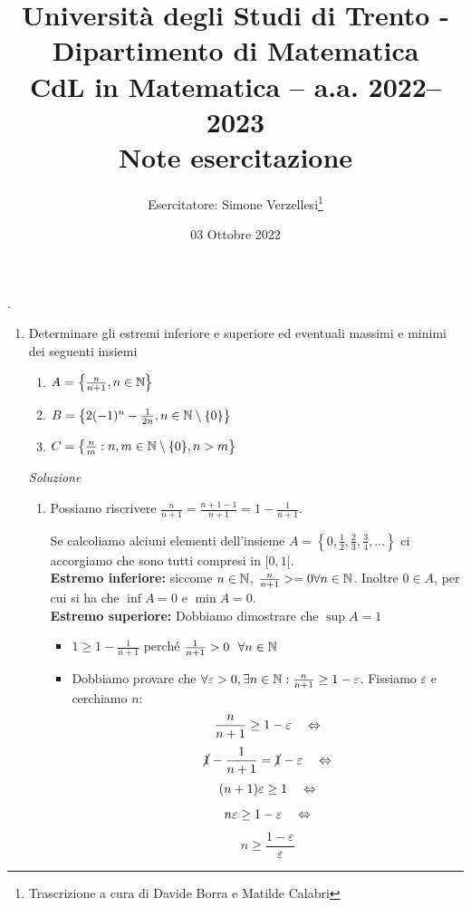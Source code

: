 \documentclass{article}
\title{Università degli Studi di Trento - Dipartimento di Matematica\\
CdL in Matematica – a.a. 2022–2023\\ Note esercitazione}
\author{Esercitatore: Simone Verzellesi\thanks{Trascrizione a cura di Davide Borra e Matilde Calabri}}
\date{03 Ottobre 2022}
\begin{document}
\maketitle
{}
\setlength{\headheight}{30pt}.
\begin{enumerate}[label=\textbf{Esercizio 3.\arabic*.},itemindent=*]
    \item Determinare gli estremi inferiore e superiore ed eventuali massimi e minimi dei seguenti insiemi 
    \begin{enumerate}
        \item $A=\left\{\frac{n}{n+1},n\in \mathbb{N}\right\}$
        \item $B=\left\{2(-1)^n-\frac{1}{2n}, n\in \mathbb{N}\setminus \{0\}\right\}$
        \item $C=\left\{\frac{n}{m}: n, m\in \mathbb{N}\setminus\{0\},n>m\right\}$
    \end{enumerate}
    \item[\textit{\large Soluzione~}]~
    \begin{enumerate}
        \item \begin{oss}
            Possiamo riscrivere $\frac{n}{n+1}=\frac{n+1-1}{n+1}=1-\frac{1}{n+1}$.
        \end{oss}
        Se calcoliamo alciuni elementi dell'insieme $A=\left\{0, \frac{1}{2}, \frac{2}{3}, \frac{3}{4},\dots\right\}$ ci accorgiamo che sono tutti compresi in $[0,1[$.\\
        \textbf{Estremo inferiore:} siccome $n\in \mathbb{N}$, $\frac{n}{n+1}>=0\forall n\in \mathbb{N}$. Inoltre $0\in A$, per cui si ha che $\inf A=0$ e $\min A=0$.\\
        \textbf{Estremo superiore:} Dobbiamo dimostrare che $\sup A=1$
        \begin{itemize}
            \item $1\geq 1-\frac{1}{n+1}$ perché $\frac{1}{n+1}>0~~\forall n\in \mathbb{N}$
            \item Dobbiamo provare che $\forall \varepsilon >0, \exists n\in \mathbb{N}:\frac{n}{n+1}\geq 1-\varepsilon$. Fissiamo $\varepsilon$ e cerchiamo $n$: \[\frac{n}{n+1}\geq 1-\varepsilon~~~\Leftrightarrow\]\[\cancel{1}-\frac{1}{n+1}=\cancel{1}-\varepsilon~~~\Leftrightarrow\]\[(n+1)\varepsilon\geq 1~~~\Leftrightarrow\]\[n\varepsilon\geq 1-\varepsilon ~~~\Leftrightarrow\]\[n\geq \frac{1-\varepsilon}{\varepsilon}\]

\end{itemize}
\end{enumerate}
\end{enumerate}
\end{document}
